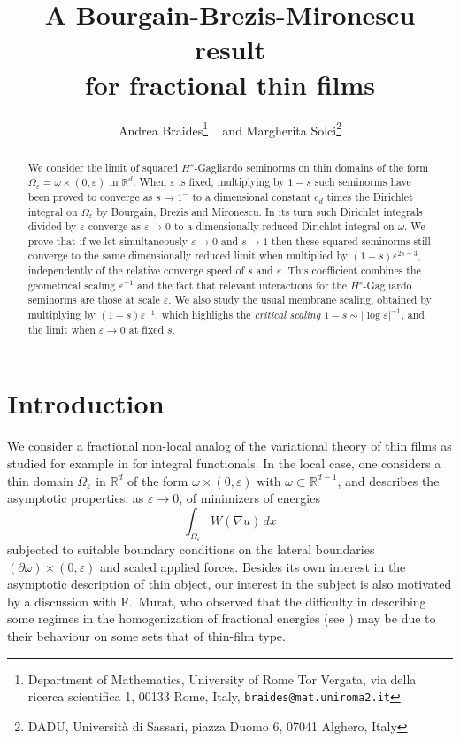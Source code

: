 \documentclass{article}
\title{A Bourgain-Brezis-Mironescu result\\ for fractional thin films}
\author{Andrea Braides\footnote{Department of Mathematics, University of Rome Tor Vergata, via della ricerca scientifica 1, 00133 Rome, Italy, {\tt braides@mat.uniroma2.it}} \ 
and Margherita Solci\footnote{DADU, Universit\`a di Sassari, piazza Duomo 6, 07041 Alghero, Italy
}}
\date{}
\newcommand{\e}{\varepsilon}
\begin{document}
 

\maketitle

\begin{abstract} We consider the limit of squared $H^s$-Gagliardo seminorms on thin domains of the form $\Omega_\varepsilon=\omega\times(0,\varepsilon)$ in $\mathbb R^d$.
When $\varepsilon$ is fixed, multiplying by $1-s$ such seminorms have been proved to converge as $s\to 1^-$ to a dimensional constant $c_d$ times the Dirichlet integral on $\Omega_\varepsilon$ by Bourgain, Brezis and Mironescu. In its turn such Dirichlet integrals divided by $\varepsilon$ converge as $\varepsilon\to 0$ to a dimensionally reduced Dirichlet integral on $\omega$. We prove that if we let simultaneously $\varepsilon\to 0$ and $s\to 1$ then these squared seminorms still converge to the same dimensionally reduced limit when multiplied by $(1-s) \varepsilon^{2s-3}$, independently of the relative converge speed of $s$ and $\varepsilon$. This coefficient combines the geometrical scaling $\varepsilon^{-1}$ and the fact that relevant interactions for the $H^s$-Gagliardo seminorms are those at scale $\varepsilon$.
We also study the usual membrane scaling, obtained by multiplying by $(1-s)\varepsilon^{-1}$, which highlighs the {\em critical scaling} $1-s\sim|\log\varepsilon|^{-1}$, and the limit when $\varepsilon\to 0$ at fixed $s$.\end{abstract}

\section{Introduction}
We consider a fractional non-local analog of the variational theory of thin films as 
studied for example in \cite{LDR,BFF} for integral functionals. 
In the local case, one considers a thin domain $\Omega_\e$ 
in $\mathbb R^d$ of the form $\omega\times (0,\e)$ with $\omega\subset\mathbb R^{d-1}$, and describes the 
asymptotic properties, as $\e\to 0$, of minimizers of energies
\begin{equation}\label{1}
\int_{\Omega_\e} W(\nabla u)\,dx
\end{equation}
subjected to suitable boundary conditions on the lateral boundaries 
$(\partial\omega)\times (0,\e)$ and scaled applied forces. 
Besides its own interest in the asymptotic description of thin object,
our interest in the subject is also motivated by a discussion with F.~Murat,
who observed that the difficulty in describing some regimes in the homogenization
of fractional energies (see \cite{BBD}) may be due to their behaviour on some sets that
of thin-film type. 
\end{document}
